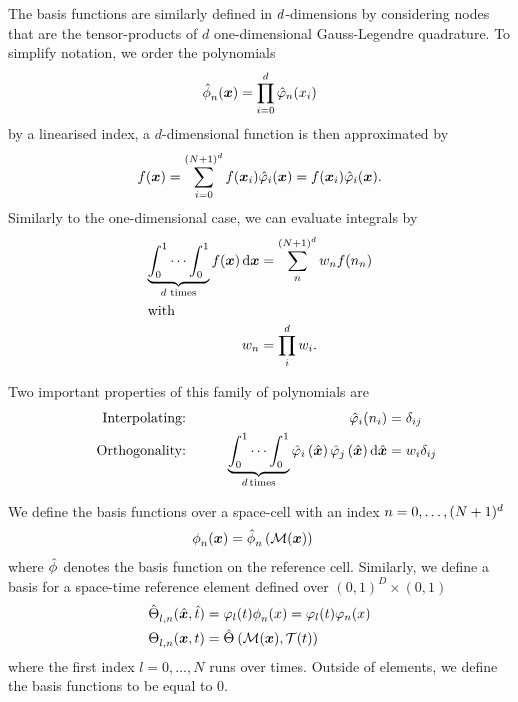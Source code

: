The basis functions are similarly defined in $d$-dimensions by considering nodes that are the tensor-products of $d$ one-dimensional Gauss-Legendre quadrature.
To simplify notation, we order the polynomials
\begin{equation}
  \label{eq:basis-space}
  \sbasisRef[][n] (\bm{x}) = \prod_{i=0}^{\dimensions} \lagrangeRef[n] (x_i)
\end{equation}
by a linearised index, a $d$-dimensional function is then approximated by
\begin{equation}
  \label{eq:lagrange-expansion}
  f(\bm{x}) = \sum_{i = 0}^{\sbasisSize} f(\bm{x}_i) \lagrangeRef[i](\bm{x}) = f(\bm{x}_i) \lagrangeRef[i](\bm{x}).
\end{equation}
Similarly to the one-dimensional case, we can evaluate integrals by
\begin{align}
  \label{eq:quadrature}
  \underbrace{\int_0^1 \cdots \int_0^1}_{\dimensions \text{ times}} f(\bm{x}) \dd{\bm{x}} &= \sum_n^{\sbasisSize} \quadWeight[n] f(\quadNode[n]) \\
  \intertext{with}
  \quadWeight[n] &= \prod_{i}^{d} \quadWeight[i].
\end{align}

Two important properties of this family of polynomials are
  \begin{alignat}{10}
    \label{eq:basis-interpolating}
&& \text{Interpolating:} \qquad && \lagrangeRef[i] (\quadNode[i]) &= \delta_{ij}\\
\label{eq:basis-orthogonality}
&& \text{Orthogonality:} \qquad &&
\underbrace{\int_0^1 \cdots \int_0^1}_{d \,\text{times}}
\lagrangeRef[i] \left( \hat{\bm{x}} \right)
\lagrangeRef[j] \left( \hat{\bm{x}} \right) \dd{\hat{\bm{x}}}
&= \quadWeight[i] \delta_{ij}
    \end{alignat}

We define the basis functions over a space-cell with an index $n = 0, \ldots, (N+1)^d$
\begin{align}\label{eq:space-basis}
  \begin{split}
  \sbasis[][n] (\bm{x}) &= \sbasisRef[][n] \left( \mapping(\bm{x}) \right)
  \end{split}
\end{align}
where $\sbasisRef$ denotes the basis function on the reference cell.
Similarly, we define a basis for a space-time reference element defined over $(0, 1)^D \times (0, 1)$
\begin{align}\label{eq:space-time-basis}
  \begin{split}
  \stbasisRef[][l,n](\hat{\bm{x}}, \hat{t}) &= \lagrange[l](t) \sbasis[][n] (x) = \lagrange[l](t) \lagrange[n](x)\\
  \stbasis[][l,n] (\bm{x}, t) &= \stbasisRef \left( \mapping(\bm{x}), \timeMapping(t) \right)
  \end{split}
\end{align}
where the first index $l = 0, \ldots, N$ runs over times.
Outside of elements, we define the basis functions to be equal to 0.

